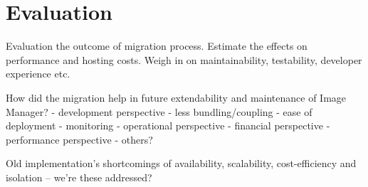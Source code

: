 \chapter{Evaluation} \label{cha:evaluation}

Evaluation the outcome of migration process. Estimate the effects on performance and hosting costs. Weigh in on maintainability, testability, developer experience etc.

How did the migration help in future extendability and maintenance of Image Manager?
- development perspective
  - less bundling/coupling
  - ease of deployment
  - monitoring
- operational perspective
- financial perspective
- performance perspective
- others?

Old implementation's shortcomings of availability, scalability, cost-efficiency and isolation -- we're these addressed?
